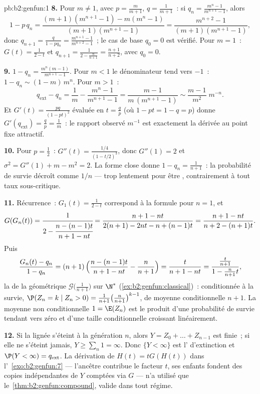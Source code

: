 \begin{solution}{pb:b2:genfun:1}
\textbf{8.} Pour $m \neq 1$, avec $p = \frac m{m+1}$, $q =
\frac1{m+1}$~: si $q_n = \frac{m^n - 1}{m^{n+1} - 1}$, alors
\[
1 - p\,q_n = \frac{(m+1)(m^{n+1} - 1) - m(m^n - 1)}
{(m+1)(m^{n+1} - 1)} = \frac{m^{n+2} - 1}{(m+1)(m^{n+1} -
1)},
\]
donc $q_{n+1} = \frac{q}{1 - pq_n} = \frac{m^{n+1} -
1}{m^{n+2} - 1}$~; le cas de base $q_0 = 0$ est vérifié. Pour $m = 1$~:
$G(t) = \frac1{2 - t}$ et $q_{n+1} = \frac1{2 -
\frac{n}{n+1}} = \frac{n+1}{n+2}$, avec $q_0 = 0$.

\textbf{9.} $1 - q_n = \frac{m^n(m - 1)}{m^{n+1} - 1}$. Pour
$m < 1$ le dénominateur tend vers $-1$~: $1 - q_n \sim (1 -
m)\,m^n$. Pour $m > 1$~:
\[
q_{\mathrm{ext}} - q_n = \frac1m - \frac{m^n - 1}{m^{n+1} -
1} = \frac{m - 1}{m\,(m^{n+1} - 1)} \sim \frac{m -
1}{m^{2}}\;m^{-n} .
\]
Et $G'(t) = \frac{pq}{(1 - pt)^2}$ évaluée en $t = \frac
qp$ (où $1 - pt = 1 - q = p$) donne $G'(q_{\mathrm{ext}})
= \frac qp = \frac1m$~: le rapport observé $m^{-1}$ est exactement
la dérivée au point fixe attractif.

\textbf{10.} Pour $p = \frac12$~: $G''(t) = \frac{1/4}{(1 -
t/2)^3}$, donc $G''(1) = 2$ et $\sigma^2 = G''(1) + m - m^2 =
2$. La forme close donne $1 - q_n = \frac1{n+1}$~: la
probabilité de survie décroît comme $1/n$ --- trop lentement pour être
, contrairement à tout taux sous-critique.

\textbf{11.} Récurrence~: $G_1(t) = \frac1{2-t}$ correspond à la
formule pour $n = 1$, et
\[
G(G_n(t)) = \cfrac{1}{2 - \cfrac{n - (n-1)t}{n+1 - nt}}
= \frac{n + 1 - nt}{2(n+1) - 2nt - n + (n-1)t}
= \frac{n+1 - nt}{n + 2 - (n+1)t} .
\]
Puis
\[
\frac{G_n(t) - q_n}{1 - q_n}
= (n+1)\,\Bigl(\frac{n - (n-1)t}{n+1 - nt} -
\frac{n}{n+1}\Bigr)
= \frac{t}{n + 1 - nt}
= \frac{\frac{t}{n+1}}{1 - \frac{n}{n+1}t} ,
\]
la  de la  géométrique $\mathcal G\bigl(\frac1{n+1}
\bigr)$ sur $\N^*$ (\cref{ex:b2:genfun:classical})~: conditionnée à la
survie, $\P(Z_n = k \mid Z_n > 0) =
\frac1{n+1}\bigl(\frac n{n+1}\bigr)^{k-1}$, de moyenne
conditionnelle $n + 1$. La moyenne non conditionnelle $1 = \E(Z_n)$ est
le produit d'une probabilité de survie tendant vers zéro et d'une
taille conditionnelle croissant linéairement.

\textbf{12.} Si la lignée s'éteint à la génération $n$, alors
$Y = Z_0 + \dots + Z_{n-1}$ est finie~; si elle ne s'éteint
jamais, $Y \geq \sum_n 1 = \infty$. Donc $\{Y < \infty\}$ est
l' d'extinction et $\P(Y < \infty) = q_{\mathrm{ext}}$.
La dérivation de $H(t) = tG(H(t))$ dans
l'~\cref{exo:b2:genfun:7} --- l'ancêtre contribue le
facteur $t$, ses enfants fondent des copies indépendantes de $Y$
comptées via $G$ --- n'a utilisé que le~\cref{thm:b2:genfun:compound}, valide dans tout régime.


\end{solution}
